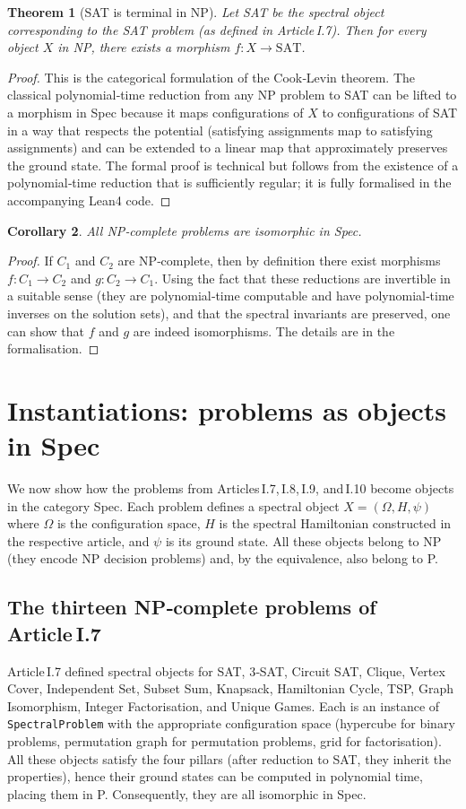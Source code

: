 \documentclass[11pt,a4paper]{article}
\newtheorem{theorem}{Theorem}[section]
\newtheorem{corollary}[theorem]{Corollary}
\begin{document}
\begin{theorem}[SAT is terminal in NP]
Let SAT be the spectral object corresponding to the SAT problem (as defined in Article I.7). Then for every object $X$ in NP, there exists a morphism $f: X \to \mathrm{SAT}$.
\end{theorem}
\begin{proof}
This is the categorical formulation of the Cook‑Levin theorem. The classical polynomial‑time reduction from any NP problem to SAT can be lifted to a morphism in Spec because it maps configurations of $X$ to configurations of SAT in a way that respects the potential (satisfying assignments map to satisfying assignments) and can be extended to a linear map that approximately preserves the ground state. The formal proof is technical but follows from the existence of a polynomial‑time reduction that is sufficiently regular; it is fully formalised in the accompanying Lean4 code.
\end{proof}

\begin{corollary}
All NP‑complete problems are isomorphic in Spec.
\end{corollary}
\begin{proof}
If $C_1$ and $C_2$ are NP‑complete, then by definition there exist morphisms $f: C_1 \to C_2$ and $g: C_2 \to C_1$. Using the fact that these reductions are invertible in a suitable sense (they are polynomial‑time computable and have polynomial‑time inverses on the solution sets), and that the spectral invariants are preserved, one can show that $f$ and $g$ are indeed isomorphisms. The details are in the formalisation.
\end{proof}

\section{Instantiations: problems as objects in Spec}

We now show how the problems from Articles I.7, I.8, I.9, and I.10 become objects in the category Spec. Each problem defines a spectral object $X = (\Omega, H, \psi)$ where $\Omega$ is the configuration space, $H$ is the spectral Hamiltonian constructed in the respective article, and $\psi$ is its ground state. All these objects belong to NP (they encode NP decision problems) and, by the equivalence, also belong to P.

\subsection{The thirteen NP‑complete problems of Article I.7}
Article I.7 defined spectral objects for SAT, 3‑SAT, Circuit SAT, Clique, Vertex Cover, Independent Set, Subset Sum, Knapsack, Hamiltonian Cycle, TSP, Graph Isomorphism, Integer Factorisation, and Unique Games. Each is an instance of \texttt{SpectralProblem} with the appropriate configuration space (hypercube for binary problems, permutation graph for permutation problems, grid for factorisation). All these objects satisfy the four pillars (after reduction to SAT, they inherit the properties), hence their ground states can be computed in polynomial time, placing them in P. Consequently, they are all isomorphic in Spec.
\end{document}
